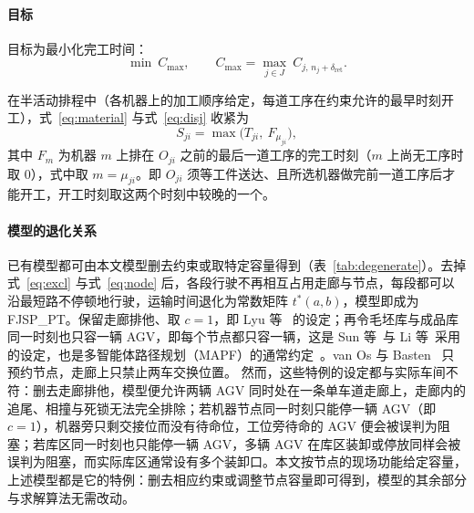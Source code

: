 \documentclass[manuscript,screen,review]{acmart}
\begin{document}
\paragraph{目标}
目标为最小化完工时间：
\begin{equation}
\label{eq:obj}
\min\ C_{\max},\qquad
C_{\max}=\max_{j\in J}\ C_{j,\,n_j+\delta_{\mathrm{ret}}} .
\end{equation}

在半活动排程中（各机器上的加工顺序给定，每道工序在约束允许的最早时刻开工），式~\eqref{eq:material} 与式~\eqref{eq:disj} 收紧为
\begin{equation}
\label{eq:bind}
S_{ji}=\max\bigl(T_{ji},\ F_{\mu_{ji}}\bigr),
\end{equation}
其中 $F_m$ 为机器 $m$ 上排在 $O_{ji}$ 之前的最后一道工序的完工时刻（$m$ 上尚无工序时取 $0$），式中取 $m=\mu_{ji}$。即 $O_{ji}$ 须等工件送达、且所选机器做完前一道工序后才能开工，开工时刻取这两个时刻中较晚的一个。

\paragraph{模型的退化关系}
\label{sec:fjsppt}
已有模型都可由本文模型删去约束或取特定容量得到（表~\ref{tab:degenerate}）。去掉式~\eqref{eq:excl} 与式~\eqref{eq:node} 后，各段行驶不再相互占用走廊与节点，每段都可以沿最短路不停顿地行驶，运输时间退化为常数矩阵 $t^{*}(a,b)$，模型即成为 FJSP\_PT。保留走廊排他、取 $c=1$，即 Lyu 等~\cite{lyu2019approach} 的设定；再令毛坯库与成品库同一时刻也只容一辆 AGV，即每个节点都只容一辆，这是 Sun 等~\cite{sun2023integrated}与 Li 等~\cite{li2026framework}采用的设定，也是多智能体路径规划（MAPF）的通常约定~\cite{gao2023mapf}。van Os 与 Basten~\cite{vanos2026exact} 只预约节点，走廊上只禁止两车交换位置。
然而，这些特例的设定都与实际车间不符：删去走廊排他，模型便允许两辆 AGV 同时处在一条单车道走廊上，走廊内的追尾、相撞与死锁无法完全排除；若机器节点同一时刻只能停一辆 AGV（即 $c=1$），机器旁只剩交接位而没有待命位，工位旁待命的 AGV 便会被误判为阻塞；若库区同一时刻也只能停一辆 AGV，多辆 AGV 在库区装卸或停放同样会被误判为阻塞，而实际库区通常设有多个装卸口。本文按节点的现场功能给定容量，上述模型都是它的特例：删去相应约束或调整节点容量即可得到，模型的其余部分与求解算法无需改动。
\end{document}
